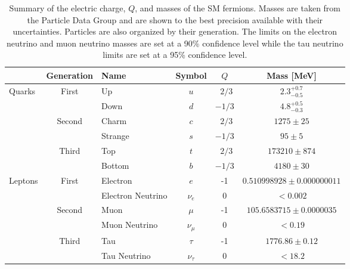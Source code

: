 \begin{table}[ht]
\centering
\small
\begin{tabular}{|lclc|c|c|}
\hline
                        & Generation & Name & Symbol  & $Q$ & Mass [MeV]\\
\hline
\hline
\multirow{6}{*}{Quarks}& \multirow{2}{*}{First}& Up & $u$   &  $~~2/3$    &  $2.3 ^{+0.7}_{-0.5}$    \\
                       & & Down & $d$  &  $-1/3$    &  $4.8^{+0.5}_{-0.3}$    \\
		       \cline{2-6} 
                       &\multirow{2}{*}{Second}& Charm & $c$   & $~~2/3$     & $1275 \pm 25$     \\
                       && Strange & $s$   & $-1/3$     & $95 \pm 5$     \\
		       \cline{2-6} 
                       &\multirow{2}{*}{Third}& Top & $t$   &  $~~2/3$    &  $173210 \pm 874$    \\
                       && Bottom & $b$   &  $-1/3$    & $4180 \pm 30$     \\
\hline
\hline
\multirow{6}{*}{Leptons}&\multirow{2}{*}{First} &Electron & $e$     &  -1    &  $0.510998928 \pm 0.000000011 $ \\
                        & & Electron Neutrino & $\nu_e$  & 0    &   $ < 0.002$    \\
		       \cline{2-6} 
                        &\multirow{2}{*}{Second} &Muon & $\mu$     &   -1   &   $105.6583715 \pm 0.0000035$   \\
                        & &Muon Neutrino & $\nu_{\mu}$  & 0   &  $ < 0.19$    \\
		       \cline{2-6} 
                        & \multirow{2}{*}{Third}&Tau & $\tau$     &   -1   &  $1776.86 \pm 0.12$    \\
                        & &Tau Neutrino & $\nu_{\tau}$  & 0    &  $< 18.2 $    \\
\hline
\end{tabular}
\label{tab:theory_fermions}
\caption{Summary of the electric charge, $Q$, and masses of the SM fermions. Masses 
are taken from the Particle Data Group \cite{PDG:2014} and 
are shown to the best precision available with their uncertainties.
Particles are also organized by their generation.
The limits on the electron neutrino and muon neutrino masses are 
set at a 90\% confidence level 
while the tau neutrino limits are set at a 95\% confidence level.}
\end{table}



